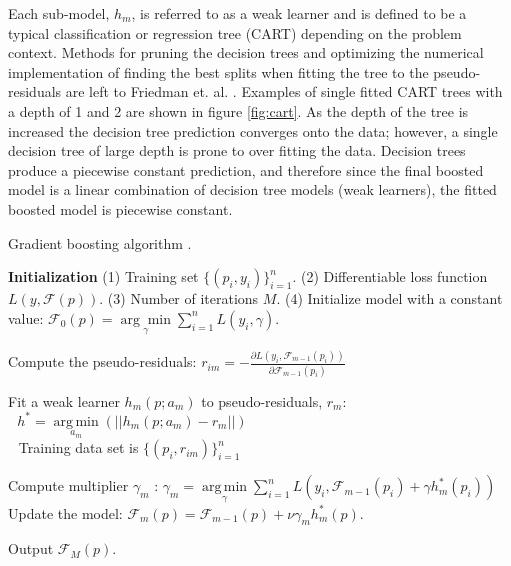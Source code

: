 Each sub-model, $h_m$, is referred to as a weak learner and is defined to be a typical classification or regression tree (CART) depending on the problem context.  Methods for pruning the decision trees and optimizing the numerical implementation of finding the best splits when fitting the tree to the pseudo-residuals are left to Friedman et. al. \cite{friedman2002}.  Examples of single fitted CART trees with a depth of 1 and 2 are shown in figure \ref{fig:cart}.  As the depth of the tree is increased the decision tree prediction converges onto the data; however, a single decision tree of large depth is prone to over fitting the data.  Decision trees produce a piecewise constant prediction, and therefore since the final boosted model is a linear combination of decision tree models (weak learners), the fitted boosted model is piecewise constant.

\begin{algorithm}[H]
    \caption{Gradient boosting algorithm \cite{friedman2002}.}
    \begin{algorithmic}[1]
    \STATE \textbf{Initialization}
    \STATE (1) Training set $\{(p_i, y_i)\}_{i=1}^n$.
    \STATE (2) Differentiable loss function $L(y, \mathcal F(p))$.
    \STATE (3) Number of iterations ${{M}}$.
    \STATE (4)   Initialize model with a constant value:
        $\mathcal F_0(p) = \underset{\gamma}{\arg\min} \sum_{i=1}^n L(y_i, \gamma).$

        \STATE Compute the pseudo-residuals:
            \STATE $r_{im} = -\frac{\partial L(y_i, \mathcal F_{m-1}(p_i))}{\partial \mathcal F_{m-1}(p_i)}$
        \ENDFOR

        \STATE Fit a weak learner $h_m(p; a_m)$ to pseudo-residuals, $r_{m}$: \\
            $\ \ \ h^* = \underset{a_m}{\operatorname{arg\,min}}(||h_m(p; a_m) - r_m||)$ \\
            $\ \ $ Training data set is $\{(p_i, r_{im})\}_{i=1}^n$ \;

        \STATE Compute multiplier $\gamma_m$ :
        $\gamma_m = \underset{\gamma}{\operatorname{arg\,min}} \sum_{i=1}^n L\left(y_i, \mathcal F_{m-1}(p_i) + \gamma h^*_m(p_i)\right)$\;
        \STATE Update the model:
        $\mathcal F_m(p) = \mathcal F_{m-1}(p) + \nu \gamma_m h^*_m(p).$

    \ENDFOR
    \STATE Output $\mathcal F_M(p).$
    \end{algorithmic}
\label{alg:boosting}
\end{algorithm}

